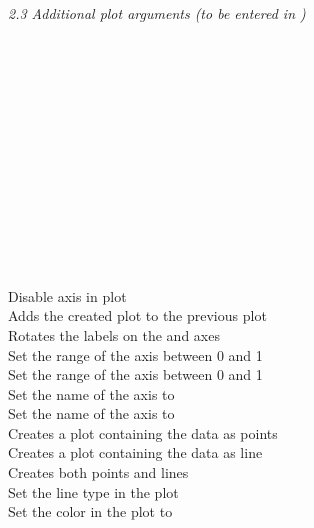 \textit{2.3 Additional plot arguments (to be entered in )} \\
\\
\begin{minipage}[t]{.4\textwidth}
\vspace*{-8pt}
 \\ 
 \\ 
 \\ 
 \\ 	
 \\ 
 \\ 
 \\ 
 \\ 
 \\ 
 \\ 
 \\ 
\end{minipage}
\begin{minipage}[t]{.6\textwidth}
Disable axis in plot \\
Adds the created plot to the previous plot  \\
Rotates the labels on the  and  axes \\
Set the range of the  axis between 0 and 1 \\
Set the range of the  axis between 0 and 1 \\
Set the name of the  axis to  \\
Set the name of the  axis to  \\
Creates a plot containing the data as points \\
Creates a plot containing the data as line \\
Creates both points and lines \\
Set the line type in the plot \\
Set the color in the plot to 
\end{minipage}
\vspace*{.5cm}

\clearpage %